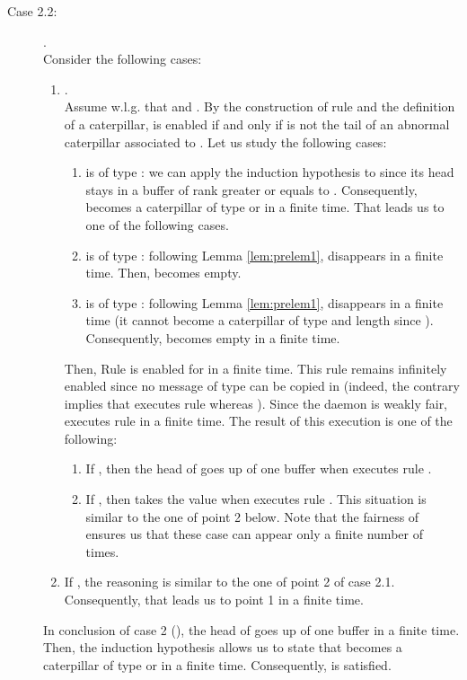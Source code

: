 \documentclass[11pt]{article}
\newenvironment{proof}{{\noindent\bf Proof. } }{{\hfill }}
\begin{document}
\begin{proof}
\begin{description}
\begin{description}
\begin{description}
\item [Case 2.2:] .\\
Consider the following cases:

\begin{enumerate}
\item .\\
Assume w.l.g. that  and .
By the construction of rule  and the definition of a caterpillar,  is enabled if and only if  is not the tail of an abnormal caterpillar  associated to . Let us study the following cases:

\begin{enumerate}
\item  is of type :  we can apply the induction hypothesis to  since its head stays in a buffer of rank greater or equals to . Consequently,  becomes a caterpillar of type  or  in a finite time. That leads us to one of the following cases.
\item  is of type : following Lemma \ref{lem:prelem1},  disappears in a finite time. Then,  becomes empty.
\item  is of type :  following Lemma \ref{lem:prelem1},  disappears in a finite time (it cannot become a caterpillar of type  and length  since ). Consequently,  becomes empty in a finite time.
\end{enumerate}

Then, Rule  is enabled for  in a finite time. This rule remains infinitely enabled since no message of type  can be copied in  (indeed, the contrary implies that  executes rule  whereas ). Since the daemon is weakly fair,   executes rule  in a finite time. The result of this execution is one of the following:

\begin{enumerate}
\item If , then the head of  goes up of one buffer when  executes rule .
\item If , then  takes the value  when  executes rule . This situation is similar to the one of point 2 below. Note that the fairness of   ensures us that these case can appear only a finite number of times.
\end{enumerate}

\item If , the reasoning is similar to the one of point 2 of case 2.1. Consequently, that leads us to point 1 in a finite time.
\end{enumerate}

In conclusion of case 2 (), the head of  goes up of one buffer in a finite time. Then, the induction hypothesis allows us to state that  becomes a caterpillar of type  or  in a finite time. Consequently,  is satisfied. 
\end{description}
\end{description}
\end{description}
\end{proof}
\end{document}
